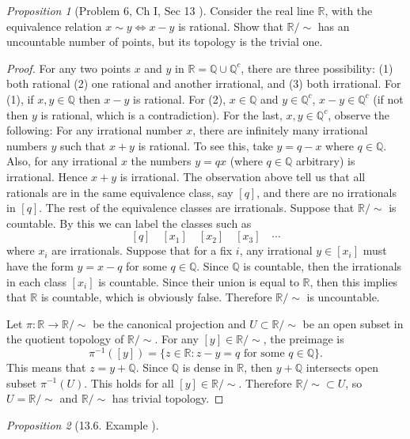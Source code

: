 \documentclass[a4paper]{article}
\theoremstyle{remark}
\newtheorem{prop}{Proposition}
\newcommand{\er}{\mathbb{R}} %
\newcommand{\rational}{\mathbb{Q}} %
\begin{document}
\begin{prop}[Problem 6, Ch I, Sec 13 \cite{bredon}]
Consider the real line $\er$, with the equivalence relation $x \sim y \Leftrightarrow x - y$ is rational. Show that $\er/{\sim}$ has an uncountable number of points, but its topology is the trivial one.
\end{prop} 
\begin{proof}
 For any two points $x$ and $y$ in $\er = \rational \cup \rational^c$, there are three possibility: (1) both rational (2) one rational and another irrational, and (3) both irrational. For (1), if $x,y \in \rational$ then $x-y$ is rational. For (2), $x \in \rational$ and $y \in \rational^c$, $x-y \in \rational^c$ (if not then $y$ is rational, which is a contradiction). For the last, $x,y \in \rational^c$, observe the following:  For any irrational number $x$, there are infinitely many irrational numbers $y$ such that $x+y$ is rational. To see this, take $y = q-x$ where $q \in \rational$. Also, for any irrational $x$ the numbers $y =qx$ (where $q \in \rational$ arbitrary) is irrational. Hence $x+y$ is irrational. The observation above tell us that all rationals are in the same equivalence class, say $[q]$, and there are no irrationals in $[q]$. The rest of the equivalence classes are irrationals. Suppose that $\er/{\sim}$ is countable. By this we can label the classes such as 
 $$
 [q] \quad [x_1] \quad [x_2] \quad  [x_3] \quad \cdots
 $$
 where $x_i$ are irrationals. Suppose that for a fix $i$, any irrational $y \in [x_i]$ must have the form $y = x-q$ for some $q \in \rational$. Since $\rational$ is countable, then the irrationals in each class $[x_i]$ is countable. Since their union is equal to $\er$, then this implies that $\er$ is countable, which is obviously false. Therefore $\er/{\sim}$ is uncountable.  
 
 Let $\pi  : \er \to \er/{\sim}$ be the canonical projection and $U \subset \er/{\sim}$ be an open subset in the quotient topology of $\er/{\sim}$. For any $[y] \in \er/{\sim}$, the preimage is
 $$
 \pi^{-1}([y]) = \{z\in \er : z-y=q \text{ for some }q \in \rational \}.
 $$
 This means that $z = y+ \rational$. Since $\rational$ is dense in $\er$, then $y+\rational$ intersects open subset $\pi^{-1}(U)$. This holds for all $[y]\in \er/\sim$. Therefore $\er/{\sim} \subset U$, so $U = \er/{\sim}$ and $\er/{\sim}$ has trivial topology. 
\end{proof}

\begin{prop}[13.6. Example \cite{bredon}]

\end{prop}
\end{document}
